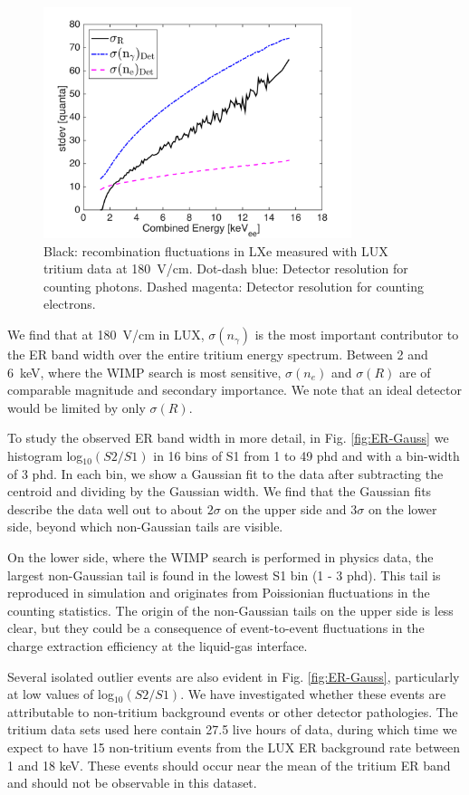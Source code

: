 \begin{figure}[h!]
\includegraphics[width=90mm]{fig/recomb_flucs.png}
\caption{Black: recombination fluctuations in LXe measured with LUX tritium data at 180~V/cm. Dot-dash blue: Detector resolution for counting photons. Dashed magenta: Detector resolution for counting electrons.}
\label{fig:recomb-flucs}
\end{figure}

We find that at 180~V/cm in LUX, $ \sigma(n_{\gamma})$ is the most important contributor to the ER band width over the entire tritium energy spectrum. Between 2 and 6~keV, where the WIMP search is most sensitive, $ \sigma(n_e)$ and $ \sigma(R)$ are of comparable magnitude and secondary importance. We note that an ideal detector would be limited by only $ \sigma(R)$.

To study the observed ER band width in more detail, in Fig. \ref{fig:ER-Gauss} we histogram log$_{10}(S2/S1)$ in 16 bins of S1 from 1 to 49 phd and with a bin-width of 3 phd. In each bin, we show a Gaussian fit to the data after subtracting the centroid and dividing by the Gaussian width. We find that the Gaussian fits describe the data well out to about $2\sigma$ on the upper side and $3\sigma$ on the lower side, beyond which non-Gaussian tails are visible.  

On the lower side, where the WIMP search is performed in physics data, the largest non-Gaussian tail is found in the lowest S1 bin (1 - 3 phd). This tail is reproduced in simulation and originates from Poissionian fluctuations in the counting statistics. The origin of the non-Gaussian tails on the upper side is less clear, but they could be a consequence of event-to-event fluctuations in the charge extraction efficiency at the liquid-gas interface.

Several isolated outlier events are also evident in Fig. \ref{fig:ER-Gauss}, particularly at low values of log$_{10}(S2/S1)$. We have investigated whether these events are attributable to non-tritium background events or other detector pathologies. The tritium data sets used here contain 27.5 live hours of data, during which time we expect to have 15 non-tritium events from the LUX ER background rate between 1 and 18 keV. These events should occur near the mean of the tritium ER band and should not be observable in this dataset. 

